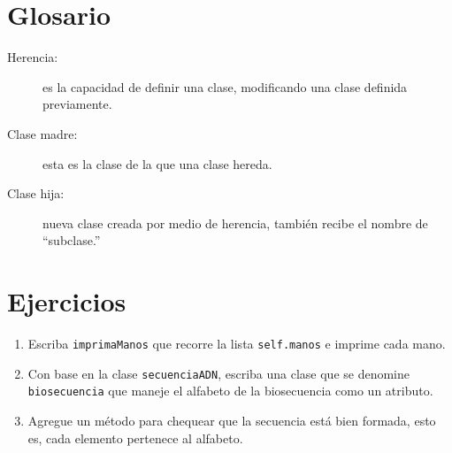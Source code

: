\section{Glosario}

\begin{description}

\item[Herencia:] es la capacidad de definir una clase, modificando 
una clase definida previamente.

\item[Clase madre:] esta es la clase de la que una clase hereda.

\item[Clase hija:] nueva clase creada por medio de herencia,
también recibe el nombre de ``subclase.''


\end{description}

\section{Ejercicios}
\begin{enumerate}

\item Escriba \texttt{imprimaManos} que recorre
la lista \texttt{self.manos} e imprime cada mano.

\item Con base en la clase \texttt{secuenciaADN}, escriba una 
clase que se denomine \texttt{biosecuencia} que maneje el 
alfabeto de la biosecuencia como un atributo.

\item Agregue un método para chequear que la secuencia está 
bien formada, esto es, cada elemento pertenece al alfabeto.


\end{enumerate}